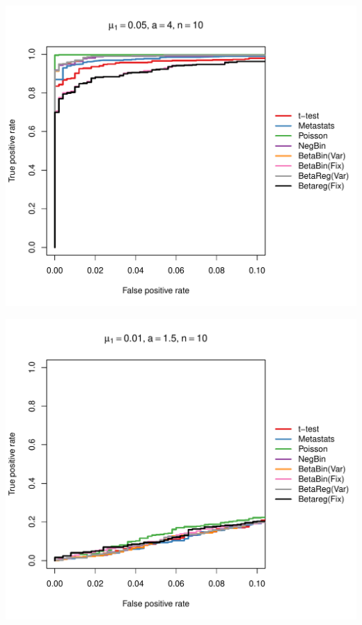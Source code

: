 \documentclass[12pt]{article}\usepackage{graphicx, color}
\makeatletter
\def\maxwidth{ %
  \ifdim\Gin@nat@width>\linewidth
    \linewidth
  \else
    \Gin@nat@width
  \fi
}
\newenvironment{knitrout}{}{} %
\makeatother
\begin{document}
\begin{knitrout}
{\centering \includegraphics[width=\maxwidth]{figure/rocs57} 

}




{\centering \includegraphics[width=\maxwidth]{figure/rocs58} 

}





\end{knitrout}
\end{document}
